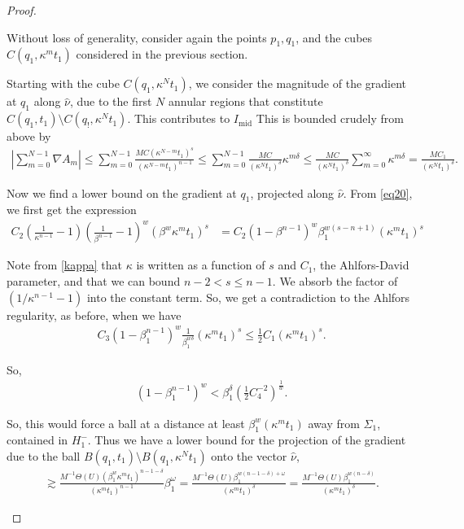 \documentclass{article}
\theoremstyle{plain}
\theoremstyle{plain}
\newcommand{\thee}{\Theta(U)}
\theoremstyle{definition}
\theoremstyle{plain}
\begin{document}
\begin{proof}
\begin{itemize}
      Without loss of generality, consider again the points  $p_1, q_1$, and the cubes $C(q_1,\kappa^m t_1)$ considered in the previous section. 
      

Starting with the cube $C(q_1,\kappa^N t_1)$, we consider the magnitude of the
gradient at $q_1$ along $\hat{\nu}$, due to the first $N$ annular regions that constitute $C(q_1,t_1)\setminus C(q_!,\kappa^{N}t_1)$. This contributes to $I_{\text{mid}}$
This is bounded crudely from above by
\begin{align}
|\sum_{m=0}^{N-1} \nabla A_m|
\le \sum_{m=0}^{N-1} \frac{MC(\kappa^{N-m}t_1)^{s}}{(\kappa^{N-m} t_1)^{n-1}}
\le \sum_{m=0}^{N-1} \frac{MC}{(\kappa^{N} t_1)^{\delta}} \kappa^{m\delta}
\le \frac{MC}{(\kappa^{N} t_1)^{\delta}} \sum_{m=0}^{\infty} \kappa^{m\delta}
= \frac{MC_1}{(\kappa^{N} t_1)^{\delta}} .
\end{align}

Now we find a lower bound on the gradient at $q_1$,
projected along $\hat{\nu}$.
From \eqref{eq20}, we first get the expression
\begin{align*}
C_2\left(\frac{1}{\kappa^{n-1}}-1\right)\left( \frac{1}{\beta^{n-1}} - 1 \right)^{w}
\left( \beta^{w} \kappa^{m} t_1 \right)^{s}
&= C_2 (1-\beta^{n-1})^{w}
\beta_1^{w (s-n+1)} (\kappa^{m} t_1)^{s} 
\end{align*}

Note from \cref{kappa} that $\kappa$ is written as a function of $s$ and $C_1$, the Ahlfors-David parameter, and that we can bound $n-2<s\leq n-1$. We absorb the factor of $(1/\kappa^{n-1} -1)$ into the constant term. So, we get a contradiction to the Ahlfors regularity, as before, when we have
\begin{align}
C_3 (1-\beta_1^{n-1})^{w}
\frac{1}{\beta_1^{w\delta}} (\kappa^{m} t_1)^{s}
\le \frac{1}{2} C_1 (\kappa^{m} t_1)^{s}.
\end{align}

So,
\begin{align}
(1-\beta_1^{n-1})^{w}
< \beta_1^{\delta} \left( \frac{1}{2} C_4^{-2} \right)^{\frac{1}{w}}.
\end{align}

So, this would force a ball at a distance at least
$\beta_1^{w} (\kappa^{m} t_1)$ away from $\Sigma_1$,
contained in $H^{-}_1$.
Thus we have a lower bound for the projection of the gradient due to the ball $B(q_1,t_1)\setminus B(q_1,\kappa^N t_1)$ onto the vector $\hat{\nu}$,
\begin{align}\label{eq70}
\gtrsim
\frac{M^{-1}\thee(\beta_1^{w} \kappa^{m} t_1)^{n-1-\delta}}{(\kappa^{m} t_1)^{n-1}}
\beta_1^{\omega}
= \frac{M^{-1}\thee\beta_1^{w(n-1-\delta)+\omega}}{(\kappa^{m} t_1)^{\delta}}
= \frac{M^{-1}\thee\beta_1^{w(n-\delta)}}{(\kappa^{m} t_1)^{\delta}} .
\end{align}


\end{itemize}
\end{proof}
\end{document}
